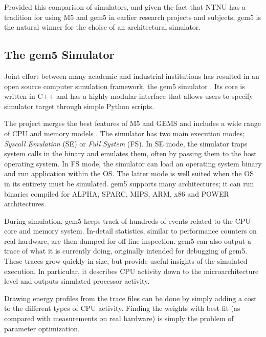 Provided this comparison of simulators, and given the fact that NTNU has a tradition
for using M5 and gem5 in earlier research projects and subjects, gem5 is the natural
winner for the choise of an architectural simulator.


\subsection{The gem5 Simulator}

Joint effort between many academic and industrial institutions has resulted in
an open source computer simulation framework, the gem5 simulator
\cite{gem5,gem5simulator}. Its core is written in C++ and has a highly modular
interface that allows users to specify simulator target through simple Python
scripts.

The project merges the best features of M5 \cite{binkert2006m5} and GEMS
\cite{GEMS} and includes a wide range of CPU and memory models
\cite{gem5hipeac}. The simulator has two main execution modes; \textit{Syscall
Emulation} (SE) or \textit{Full System} (FS). In SE mode, the simulator traps
system calls in the binary and emulates them, often by passing them to the host
operating system. In FS mode, the simulator can load an operating system binary
and run application within the OS. The latter mode is well suited when the OS in
its entirety must be simulated. gem5 supports many architectures; it can run
binaries compiled for ALPHA, SPARC, MIPS, ARM, x86 and POWER architectures.

During simulation, gem5 keeps track of hundreds of events related to the CPU
core and memory system. In-detail statistics, similar to performance counters on
real hardware, are then dumped for off-line inspection. gem5 can also output a
trace of what it is currently doing, originally intended for debugging of gem5.
These traces grow quickly in size, but provide useful insights of the simulated
execution. In particular, it describes CPU activity down to the
microarchitecture level and outputs simulated processor activity.

Drawing energy profiles from the trace files can be done by simply adding a cost
to the different types of CPU activity. Finding the weights with best fit
(as compared with measurements on real hardware) is simply the problem of
parameter optimization.
